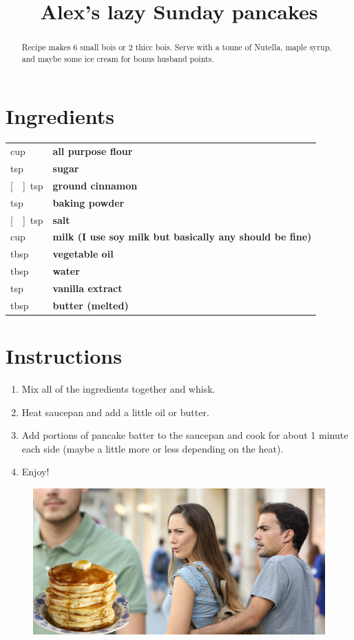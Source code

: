 \documentclass[main.tex]{subfiles}
\title{Alex's lazy Sunday pancakes}
\begin{document}
\maketitle%

\begin{abstract}
Recipe makes 6 small bois or 2 thicc bois.  Serve with a tonne of Nutella, maple syrup, and maybe some ice cream for bonus husband points.
\end{abstract}

\section{Ingredients}

\vspace*{-\baselineskip}
\begin{table}[ht]
	\begin{tabularx}{\textwidth}{>{\hsize=0.333\hsize}X>{\bf\hsize=1\hsize}X}
	\unit[1]{cup} & all purpose flour\\
	\unit[1]{tsp} & sugar\\
	\unit[\nicefrac{1}{4}]{tsp} & ground cinnamon\\
	\unit[2]{tsp} & baking powder\\
	\unit[\nicefrac{1}{4}]{tsp} & salt\\
	\unit[1]{cup} & milk (I use soy milk but basically any should be fine)\\
	\unit[1]{tbsp} & vegetable oil\\
	\unit[1]{tbsp} & water \\
	\unit[1]{tsp} & vanilla extract\\
	\unit[2]{tbsp} & butter (melted)
	\end{tabularx}
\end{table}

\section{Instructions}

\begin{enumerate}
    \item Mix all of the ingredients together and whisk.
    \item Heat saucepan and add a little oil or butter.
    \item Add portions of pancake batter to the saucepan and cook for about 1 minute each side (maybe a little more or less depending on the heat).
    \item Enjoy!
\end{enumerate}

\begin{figure}
  \includegraphics{alex-pancakes.jpg}
\end{figure}
\end{document}
